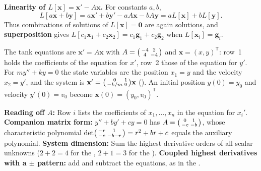 \documentclass[10pt]{scrartcl}
\newcommand{\vv}[1]{\mathbf{#1}}
\begin{document}
\medskip\noindent\textbf{Linearity of $L[\vv x]=\vv x'-A\vv x$.} For constants $a,b$,
\[
  L[a\vv x+b\vv y]=a\vv x'+b\vv y'-aA\vv x-bA\vv y=aL[\vv x]+bL[\vv y].
\]
Thus combinations of solutions of $L[\vv x]=\vv 0$ are again solutions, and \textbf{superposition} gives $L[c_1\vv x_1+c_2\vv x_2]=c_1\vv g_1+c_2\vv g_2$ when $L[\vv x_i]=\vv g_i$.

\revisit The tank equations are $\vv x'=A\vv x$ with $A=\begin{psmallmatrix}-4&2\\4&-4\end{psmallmatrix}$ and $\vv x=(x,y)^{\mathsf T}$: row~1 holds the coefficients of the equation for $x'$, row~2 those of the equation for $y'$. For $my''+ky=0$ the state variables are the position $x_1=y$ and the velocity $x_2=y'$, and the system is $\vv x'=\begin{psmallmatrix}0&1\\-k/m&0\end{psmallmatrix}\vv x$ (). An initial position $y(0)=y_0$ and velocity $y'(0)=v_0$ become $\vv x(0)=(y_0,v_0)^{\mathsf T}$.

\begin{shortcuts}
  \ii \textbf{Reading off $A$:} Row $i$ lists the coefficients of $x_1,\dots,x_n$ in the equation for $x_i'$.
  \ii \textbf{Companion matrix form:} $y''+by'+cy=0$ has $A=\begin{psmallmatrix}0&1\\-c&-b\end{psmallmatrix}$, whose characteristic polynomial $\det\begin{psmallmatrix}-r&1\\-c&-b-r\end{psmallmatrix}=r^2+br+c$ equals the auxiliary polynomial.
  \ii \textbf{System dimension:} Sum the highest derivative orders of all scalar unknowns ($2+2=4$ for the , $2+1=3$ for the ).
  \ii \textbf{Coupled highest derivatives with a $\pm$ pattern:} add and subtract the equations, as in the .
\end{shortcuts}
\end{document}
